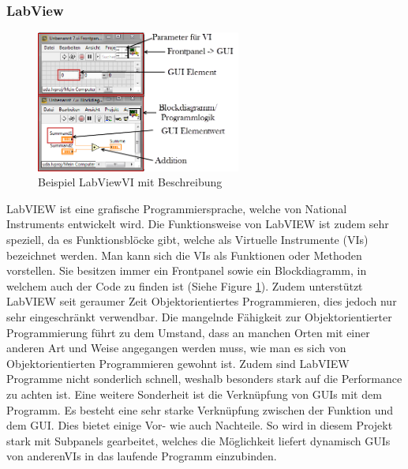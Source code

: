 \documentclass[10pt]{scrartcl}
\begin{document}
\subsubsection{LabView}
\begin{figure}
	\begin{center}
		\includegraphics[width=0.6\textwidth]{pictures/LabVIEWExample}
		\caption{Beispiel LabView\gls{VI} mit Beschreibung}
		\label{fig:LabViewExample}
	\end{center}
\end{figure}
\gls{LabVIEW} ist eine grafische Programmiersprache, welche von National Instruments entwickelt wird. Die Funktionsweise von \gls{LabVIEW} ist zudem sehr speziell, da es Funktionsblöcke gibt, welche als Virtuelle Instrumente (\gls{VI}s) bezeichnet werden. Man kann sich die \gls{VI}s als Funktionen oder Methoden vorstellen. Sie besitzen immer ein \gls{Frontpanel} sowie ein \gls{Blockdiagramm}, in welchem auch der Code zu finden ist (Siehe Figure \ref{fig:LabViewExample}). Zudem unterstützt \gls{LabVIEW} seit geraumer Zeit Objektorientiertes Programmieren, dies jedoch nur sehr eingeschränkt verwendbar.
\newline
Die mangelnde Fähigkeit zur Objektorientierter Programmierung führt zu dem Umstand, dass an manchen Orten mit einer anderen Art und Weise angegangen werden muss, wie man es sich von Objektorientierten Programmieren gewohnt ist. Zudem sind \gls{LabVIEW} Programme nicht sonderlich schnell, weshalb besonders stark auf die Performance zu achten ist.
\newline
Eine weitere Sonderheit ist die Verknüpfung von GUIs mit dem Programm. Es besteht eine sehr starke Verknüpfung zwischen der Funktion und dem GUI. Dies bietet einige Vor- wie auch Nachteile. So wird in diesem Projekt stark mit \gls{Subpanel}s gearbeitet, welches die Möglichkeit liefert dynamisch GUIs von anderen\gls{VI}s in das laufende Programm einzubinden.   
\end{document}
